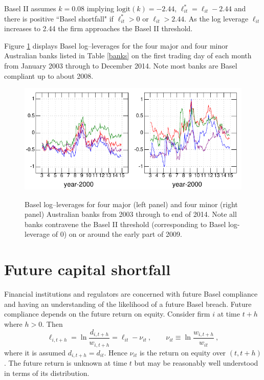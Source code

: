 \documentclass[authoryear]{elsarticle}
\newcommand{\logit}{\mathrm{logit}}
\newcommand{\fref}[1]{Figure \ref{#1}}
\newcommand{\tref}[1]{Table \ref{#1}}
\newcommand{\cq}{\ , \qquad}
\begin{document}
Basel II assumes $k=0.08$ implying $\logit(k)=-2.44$,  $\ell_{it}^*=\ell_{it}-2.44$  and there is  positive  ``Basel shortfall"  if
$\ell^*_{it}>0$ or $\ell_{it} > 2.44$.
As the log leverage $\ell_{it}$  increases to 2.44 the firm approaches the Basel II threshold. 

\fref{Bloglev} displays Basel log--leverages for the four major and four minor Australian banks listed in \tref{banks} on the first trading day of each month from January 2003  through to December 2014.  Note most banks are Basel compliant up to about 2008.

\begin{figure}[htbp]
\begin{center}
\label{Bloglev}
\includegraphics{Bloglev.pdf}
\caption{Basel log--leverages for four major (left panel) and four minor (right panel) Australian banks from 2003 through to end of 2014.  Note all banks contravene the Basel II threshold (corresponding to Basel log-leverage of 0) on or around the early part of 2009.}
\end{center}
\end{figure}


\section{Future capital shortfall}

Financial institutions and regulators are concerned with future Basel compliance and having an understanding of  the likelihood of a  future Basel breach.   Future compliance depends on the future return on equity.   Consider  firm $i$ at time  $t+h$ where $h>0$.  Then
$$
\ell_{i,t+h} = \ln \frac{d_{i,t+h}}{w_{i,t+h}} = \ell_{it} -\nu_{it}\cq \nu_{it}\equiv \ln\frac{w_{i,t+h}}{w_{it}}  \ ,
$$
where it is assumed $d_{i,t+h}=d_{it}$.  Hence $\nu_{it}$ is the return on equity over $(t,t+h)$.  The future return is unknown at time $t$ but may be reasonably well understood in terms of its distribution.
\end{document}
